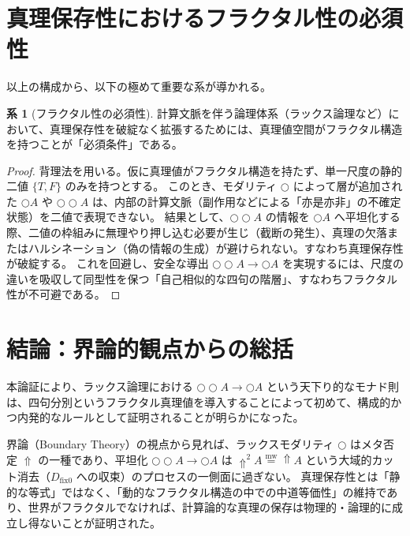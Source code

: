 \documentclass[11pt,a4paper]{article}
\theoremstyle{definition}
\newtheorem{corollary}{系}[section]
\newcommand{\mweq}{\mathrel{\overset{\mathrm{mw}}{=}}}
\newcommand{\dfix}{D_{\mathrm{fix}0}} %
\newcommand{\metanegation}{\Uparrow}
\newcommand{\Lax}{\bigcirc} %
\begin{document}
\section{真理保存性におけるフラクタル性の必須性}

以上の構成から、以下の極めて重要な系が導かれる。

\begin{corollary}[フラクタル性の必須性]
計算文脈を伴う論理体系（ラックス論理など）において、真理保存性を破綻なく拡張するためには、真理値空間がフラクタル構造を持つことが「必須条件」である。
\end{corollary}
\begin{proof}
背理法を用いる。仮に真理値がフラクタル構造を持たず、単一尺度の静的二値 $\{T, F\}$ のみを持つとする。
このとき、モダリティ $\Lax$ によって層が追加された $\Lax A$ や $\Lax\Lax A$ は、内部の計算文脈（副作用などによる「亦是亦非」の不確定状態）を二値で表現できない。
結果として、$\Lax\Lax A$ の情報を $\Lax A$ へ平坦化する際、二値の枠組みに無理やり押し込む必要が生じ（截断の発生）、真理の欠落またはハルシネーション（偽の情報の生成）が避けられない。すなわち真理保存性が破綻する。
これを回避し、安全な導出 $\Lax\Lax A \to \Lax A$ を実現するには、尺度の違いを吸収して同型性を保つ「自己相似的な四句の階層」、すなわちフラクタル性が不可避である。
\end{proof}

\section{結論：界論的観点からの総括}

本論証により、ラックス論理における $\Lax\Lax A \to \Lax A$ という天下り的なモナド則は、四句分別というフラクタル真理値を導入することによって初めて、構成的かつ内発的なルールとして証明されることが明らかになった。

界論（Boundary Theory）の視点から見れば、ラックスモダリティ $\Lax$ はメタ否定 $\metanegation$ の一種であり、平坦化 $\Lax\Lax A \to \Lax A$ は $\metanegation^2 A \mweq \metanegation A$ という大域的カット消去（$\dfix$ への収束）のプロセスの一側面に過ぎない。
真理保存性とは「静的な等式」ではなく、「動的なフラクタル構造の中での中道等価性」の維持であり、世界がフラクタルでなければ、計算論的な真理の保存は物理的・論理的に成立し得ないことが証明された。
\end{document}
